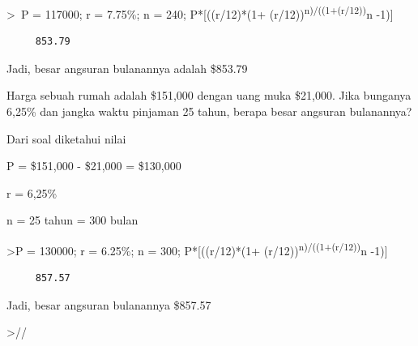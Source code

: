 \documentclass[
]{book}
\begin{document}
\textgreater~P = 117000; r = 7.75\%; n = 240; P*{[}((r/12)*(1+ (r/12))\textsuperscript{n)/((1+(r/12))}n -1){]}

\begin{verbatim}
     853.79 
\end{verbatim}

Jadi, besar angsuran bulanannya adalah \$853.79

Harga sebuah rumah adalah \$151,000 dengan uang muka \$21,000. Jika bunganya 6,25\% dan jangka waktu pinjaman 25 tahun, berapa besar angsuran bulanannya?

Dari soal diketahui nilai

P = \$151,000 - \$21,000 = \$130,000

r = 6,25\%

n = 25 tahun = 300 bulan

\textgreater P = 130000; r = 6.25\%; n = 300; P*{[}((r/12)*(1+ (r/12))\textsuperscript{n)/((1+(r/12))}n -1){]}

\begin{verbatim}
     857.57 
\end{verbatim}

Jadi, besar angsuran bulanannya \$857.57

\textgreater//

\backmatter
\end{document}
